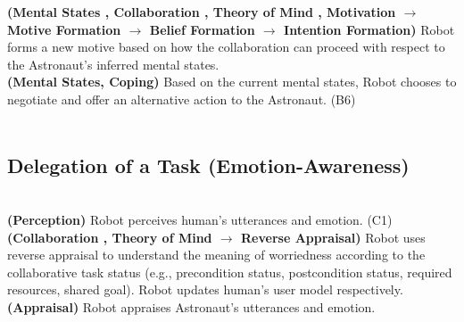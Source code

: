 \noindent\textbf{(Mental States , Collaboration , Theory of Mind , Motivation
$\rightarrow$ Motive Formation $\rightarrow$ Belief Formation $\rightarrow$
Intention Formation)} Robot forms a new motive based on how the collaboration
can proceed with respect to the Astronaut's inferred mental states.\\

\noindent\textbf{(Mental States, Coping)} Based on the current mental states,
Robot chooses to negotiate and offer an alternative action to the Astronaut.
(B6)\\

\noindent{}\\
  
\noindent{}

\subsection{Delegation of a Task (Emotion-Awareness)}
\label{sec:wt-exp3}

\noindent{}\\

\noindent\textbf{(Perception)} Robot perceives human's utterances and emotion.
(C1)\\

\noindent\textbf{(Collaboration , Theory of Mind $\rightarrow$ Reverse
Appraisal)} Robot uses reverse appraisal to understand the meaning of
worriedness according to the collaborative task status (e.g., precondition
status, postcondition status, required resources, shared goal). Robot updates
human's user model respectively.\\

\noindent\textbf{(Appraisal)} Robot appraises Astronaut's utterances and
emotion.\\

